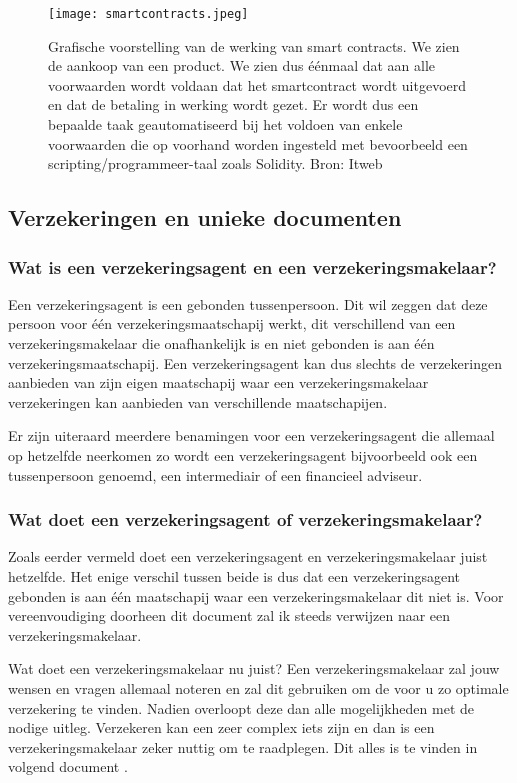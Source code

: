  \begin{figure}
	\texttt{[image: smartcontracts.jpeg]}
	\caption{Grafische voorstelling van de werking van smart contracts. We zien de aankoop van een product. We zien dus éénmaal dat aan alle voorwaarden wordt voldaan dat het smartcontract wordt uitgevoerd en dat de betaling in werking wordt gezet. Er wordt dus een bepaalde taak geautomatiseerd bij het voldoen van enkele voorwaarden die op voorhand worden ingesteld met bevoorbeeld een scripting/programmeer-taal zoals Solidity. Bron: Itweb}
	\label{fig:smartcontracts}
\end{figure}


\subsection{Verzekeringen en unieke documenten}
\subsubsection{Wat is een verzekeringsagent en een verzekeringsmakelaar?}
Een verzekeringsagent is een gebonden tussenpersoon. Dit wil zeggen dat deze persoon voor één verzekeringsmaatschapij werkt, dit verschillend van een verzekeringsmakelaar die onafhankelijk is en niet gebonden is aan één verzekeringsmaatschapij. Een verzekeringsagent kan dus slechts de verzekeringen aanbieden van zijn eigen maatschapij waar een verzekeringsmakelaar verzekeringen kan aanbieden van verschillende maatschapijen. 

Er zijn uiteraard meerdere benamingen voor een verzekeringsagent die allemaal op hetzelfde neerkomen zo wordt een verzekeringsagent bijvoorbeeld ook een tussenpersoon genoemd, een intermediair of een financieel adviseur. 

\subsubsection{Wat doet een verzekeringsagent of verzekeringsmakelaar?}
Zoals eerder vermeld doet een verzekeringsagent en verzekeringsmakelaar juist hetzelfde. Het enige verschil tussen beide is dus dat een verzekeringsagent gebonden is aan één maatschapij waar een verzekeringsmakelaar dit niet is. Voor vereenvoudiging doorheen dit document zal ik steeds verwijzen naar een verzekeringsmakelaar. 

Wat doet een verzekeringsmakelaar nu juist? Een verzekeringsmakelaar zal jouw wensen en vragen allemaal noteren en zal dit gebruiken om de voor u zo optimale verzekering te vinden. Nadien overloopt deze dan alle mogelijkheden met de nodige uitleg. Verzekeren kan een zeer complex iets zijn en dan is een verzekeringsmakelaar zeker nuttig om te raadplegen. Dit alles is te vinden in volgend document \textcite{Verzekeruzelf.nl}.

